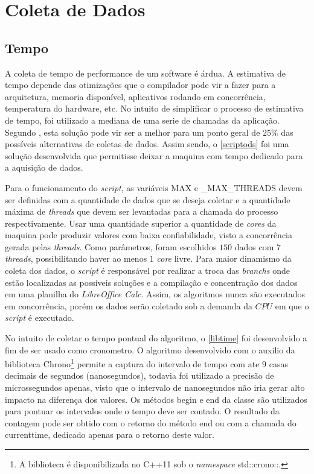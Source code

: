 
\chapter{Coleta de Dados} %
\label{cha:coleta_de_dados}

\section{Tempo} %
\label{sec:tempo}

A coleta de tempo de performance de um software é árdua. A estimativa de tempo depende das otimizações que o compilador pode vir a fazer para a arquitetura, memoria disponível, aplicativos rodando em concorrência, temperatura do hardware, etc. No intuito de simplificar o processo de estimativa de tempo, foi utilizado a mediana de uma serie de chamadas da aplicação. Segundo , esta solução pode vir ser a melhor para um ponto geral de $25\%$ das possíveis alternativas de coletas de dados. Assim sendo, o \autoref{scriptods} foi uma solução desenvolvida que permitisse deixar a maquina com tempo dedicado para a aquisição de dados.

Para o funcionamento do \textit{script}, as variáveis {\code MAX} e {\code \_MAX\_THREADS} devem ser definidas com a quantidade de dados que se deseja coletar e a quantidade máxima de \textit{threads} que devem ser levantadas para a chamada do processo respectivamente. Usar uma quantidade superior a quantidade de \textit{cores}  da maquina pode produzir valores com baixa confiabilidade, visto a concorrência gerada pelas \textit{threads}. Como parâmetros, foram escolhidos $150$ dados com $7$ \textit{threads}, possibilitando haver ao menos $1$ \textit{core} livre. Para maior dinamismo da coleta dos dados, o \textit{script} é responsável por realizar a troca das \textit{branchs} onde estão localizadas as possíveis soluções e a compilação e concentração dos dados em uma planilha do \textit{LibreOffice Calc}. Assim, os algoritmos nunca são executados em concorrência, porém os dados serão coletado sob a demanda da $CPU$ em que o \textit{script} é executado.

No intuito de coletar o tempo pontual do algoritmo, o \autoref{libtime} foi desenvolvido a fim de ser usado como cronometro. O algoritmo desenvolvido com o auxilio da biblioteca {\code Chrono}\footnote{A biblioteca é disponibilizada no {\code C++11} sob o \textit{namespace} {\code std::crono::}.} permite a captura do intervalo de tempo com ate $9$ casas decimais de segundos (nanosegundos), todavia foi utilizado a precisão de microssegundos apenas, visto que o intervalo de nanosegundos não iria gerar alto impacto na diferença dos valores. Os métodos {\code begin} e {\code end} da classe são utilizados para pontuar os intervalos onde o tempo deve ser contado. O resultado da contagem pode ser obtido com o retorno do método {\code end} ou com a chamada do {\code currenttime}, dedicado apenas para o retorno deste valor.

